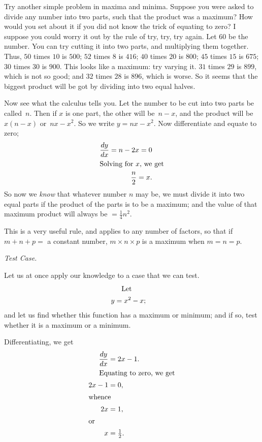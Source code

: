 \documentclass[12pt]{book}[2005/09/16]
\newcommand\Subsection[1]{%
  \medskip\pagebreak[1]\par\textit{#1}\pagebreak[0]\par%
}
\newcommand{\DPPageSep}[2]{\Pagelabel{#2}}
\newcommand{\Pagelabel}[1]
  {\phantomsection\label{#1}}
\begin{document}
Try another simple problem in maxima and minima.
Suppose you were asked to divide any number into
two parts, such that the product was a maximum?
How would you set about it if you did not know
the trick of equating to zero? I suppose you could
worry it out by the rule of try, try, try again. Let
$60$ be the number. You can try cutting it into two
parts, and multiplying them together. Thus, $50$ times
$10$ is $500$; $52$ times $8$ is $416$; $40$ times $20$ is $800$; $45$
times $15$ is $675$; $30$ times $30$ is $900$. This looks like
a maximum: try varying it. $31$ times $29$ is $899$,
which is not so good; and $32$ times $28$ is $896$, which
is worse. So it seems that the biggest product will
be got by dividing into two equal halves.

Now see what the calculus tells you. Let the
number to be cut into two parts be called~$n$. Then
if $x$ is one part, the other will be~$n-x$, and the product
will be $x(n-x)$ or~$nx-x^2$. So we write $y=nx-x^2$.
Now differentiate and equate to zero;
\begin{align*}
\dfrac{dy}{dx} = n - 2x = 0\\
\intertext{Solving for~$x$, we get} \dfrac{n}{2} = x.\\
\end{align*}
So now we \emph{know} that whatever number $n$ may be,
we must divide it into two equal parts if the product
of the parts is to be a maximum; and the value of
that maximum product will always be $ = \tfrac{1}{4} n^2$.

This is a very useful rule, and applies to any number
of factors, so that if $m+n+p=$ a constant number,
$m×n×p$ is a maximum when $m=n=p$.
\DPPageSep{112.png}{100}%


\newpage%
\Subsection{Test Case.}
Let us at once apply our knowledge to a case that
we can test.
%
\begin{align*}
\intertext{\indent Let} y &= x^2 - x;
\end{align*}
and let us find whether this function has a maximum
or minimum; and if so, test whether it is a maximum
or a minimum.

Differentiating, we get
\begin{align*}
\frac{dy}{dx} &= 2x - 1. \\
\intertext{\indent Equating to zero, we get}
2x - 1 &= 0, \\
\intertext{whence}
2x &= 1, \\
\intertext{or}
x &= \tfrac{1}{2}.
\end{align*}
\end{document}
